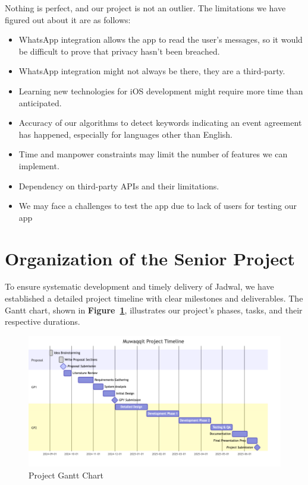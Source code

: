 \documentclass[12pt,a4paper,twoside]{report}
\begin{document}
Nothing is perfect, and our project is not an outlier. The limitations we have figured out about it are as follows:
\begin{itemize}
    \item WhatsApp integration allows the app to read the user's messages, so it would be difficult to prove that privacy hasn't been breached.
    \item WhatsApp integration might not always be there, they are a third-party.
    \item Learning new technologies for iOS development might require more time than anticipated.
    \item Accuracy of our algorithms to detect keywords indicating an event agreement has happened, especially for languages other than English.
    \item Time and manpower constraints may limit the number of features we can implement.
    \item Dependency on third-party APIs and their limitations.
    \item We may face a challenges to test the app due to lack of users for testing our app
\end{itemize}

\section{Organization of the Senior Project}

To ensure systematic development and timely delivery of Jadwal, we have established a detailed project timeline with clear milestones and deliverables. The Gantt chart, shown in \textbf{Figure~\ref{fig:project-gantt-chart}}, illustrates our project's phases, tasks, and their respective durations.

\begin{figure}[!h]
    \centering
    \includegraphics[width=\textwidth]{images/gantt.png}
    \caption{Project Gantt Chart}
    \label{fig:project-gantt-chart}
\end{figure}
\end{document}
